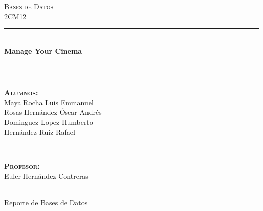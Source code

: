 \documentclass[12pt, fleqn]{report}                             %
\author{Oscar Andrés Rosas}                                     %
\begin{document}
\begin{titlepage}

    \center
    \textsc{\Large Bases de Datos}\\[0.5cm] 
    \textsc{\large 2CM12}\\[1.5cm]

    \rule{\linewidth}{0.5mm} \\[1.0cm]
        { \huge \bfseries Manage Your Cinema}\\[1.0cm] 
    \rule{\linewidth}{0.5mm} \\[2.0cm]
     
    \begin{minipage}{0.4\textwidth}
        \begin{flushleft} \large
            \textbf{\textsc{Alumnos:}}\\
            \small{
                Maya Rocha Luis Emmanuel        \\
                Rosas Hernández Óscar Andrés    \\
                Dominguez Lopez Humberto        \\
                Hernández Ruiz Rafael
            }
        \end{flushleft}
    \end{minipage}
    ~
    \begin{minipage}{0.4\textwidth}
        \begin{flushright} \large
            \textbf{\textsc{Profesor: }}\\
            Euler Hernández Contreras
        \end{flushright}
    \end{minipage}\\[3,5cm]

    {\LARGE Reporte de Bases de Datos}
    \vfill

\end{titlepage}




\tableofcontents{}
\label{sec:Index}

\clearpage


\end{document}
